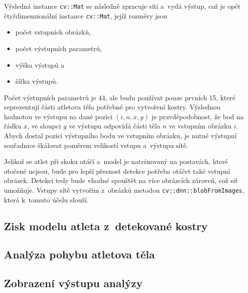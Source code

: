 Výsledná instance \texttt{cv::Mat} se následně zpracuje sítí a~vydá výstup, což je opět čtyřdimenzionální instance \texttt{cv::Mat}, jejíž rozměry jsou
\begin{itemize}
\item počet vstupních obrázků,
\item počet výstupních parametrů,
\item výška výstupů a
\item šířka výstupů.
\end{itemize}
Počet výstupních parametrů je 44, ale budu používat pouze prvních 15, které reprezentují části atletova těla potřebné pro vytvoření kostry. Výslednou hodnotou ve výstupu na dané pozici $(i,n,x,y)$ je pravděpodobnost, že bod na řádku $x$, ve sloupci $y$ ve výstupu odpovídá části těla $n$ ve vstupním obrázku $i$. Abych dostal pozici výstupního bodu ve vstupním obrázku, je nutné výstupní souřadnice škálovat poměrem velikostí vstupu a~výstupu sítě.

Jelikož se atlet při skoku otáčí a~model je natrénovaný na postavách, které otočené nejsou, bude pro lepší přesnost detekce potřeba otáčet také vstupní obrázek. Detekci tedy bude vhodné spouštět na více obrázcích zároveň, což siť umožňuje. Vstupy sítě vytvořím z~obrázků metodou \texttt{cv::dnn::blobFromImages}, která k~tomuto účelu slouží.

\subsection{Zisk modelu atleta z~detekované kostry}

\subsection{Analýza pohybu atletova těla}

\subsection{Zobrazení výstupu analýzy}


















